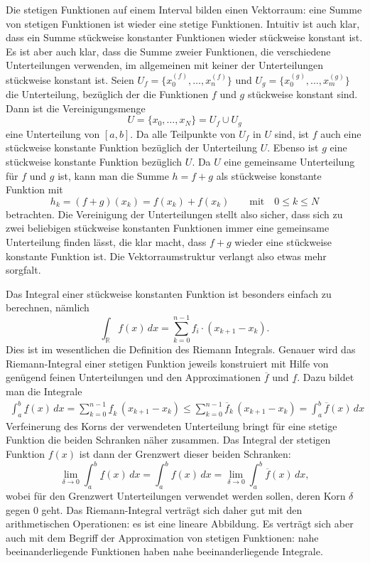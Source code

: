 Die stetigen Funktionen auf einem Interval bilden einen Vektorraum: eine
Summe von stetigen Funktionen ist wieder eine stetige Funktionen.
Intuitiv ist auch klar, dass ein Summe stückweise konstanter Funktionen
wieder stückweise konstant ist.
Es ist aber auch klar, dass die Summe zweier Funktionen, die verschiedene
Unterteilungen verwenden, im allgemeinen mit keiner der Unterteilungen
stückweise konstant ist.
Seien $U_f=\{x_0^{(f)},\dots,x_n^{(f)}\}$ und
$U_g=\{x_0^{(g)},\dots,x_m^{(g)}\}$ die Unterteilung, bezüglich der 
die Funktionen $f$ und $g$ stückweise konstant sind.
Dann ist die Vereinigungsmenge
\[
U= \{x_0,\dots,x_N\} = U_f\cup U_g
\]
eine Unterteilung von $[a,b]$.
Da alle Teilpunkte von $U_f$ in $U$ sind, ist $f$ auch eine stückweise
konstante Funktion bezüglich der Unterteilung $U$. 
Ebenso ist $g$ eine stückweise konstante Funktion bezüglich $U$.
Da $U$ eine gemeinsame Unterteilung für $f$ und $g$ ist, kann man
die Summe $h=f+g$ als stückweise konstante Funktion mit
\[
h_k
=
(f+g)(x_k)
= 
f(x_k) + f(x_k)
\qquad\text{mit}\quad
0\le k\le N
\]
betrachten.
Die Vereinigung der Unterteilungen stellt also sicher, dass sich
zu zwei beliebigen stückweise konstanten Funktionen immer eine
gemeinsame Unterteilung finden lässt, die klar macht, dass $f+g$
wieder eine stückweise konstante Funktion ist.
Die Vektorraumstruktur verlangt also etwas mehr sorgfalt.

Das Integral einer stückweise konstanten Funktion ist besonders einfach 
zu berechnen, nämlich
\[
\int_{\mathbb R} f(x)\,dx = \sum_{k=0}^{n-1} f_i\cdot (x_{k+1}-x_k).
\]
Dies ist im wesentlichen die Definition des Riemann Integrals.
Genauer wird das Riemann-Integral einer stetigen Funktion jeweils
konstruiert mit Hilfe von genügend feinen Unterteilungen und den
Approximationen $\overline{f}$ und $\underline{f}$.
Dazu bildet man die Integrale
\begin{align*}
\int_a^b \underline{f}(x)\,dx
=
\sum_{k=0}^{n-1} \underline{f}_{k}\,(x_{k+1}-x_k)
\le
\sum_{k=0}^{n-1} \overline{f}_{k}\,(x_{k+1}-x_k)
=
\int_a^b \overline{f}(x)\,dx
\end{align*}
Verfeinerung des Korns der verwendeten Unterteilung bringt für eine
stetige Funktion die beiden Schranken näher zusammen.
Das Integral der stetigen Funktion $f(x)$ ist dann der Grenzwert
dieser beiden Schranken:
\[
\lim_{\delta\to 0}
\int_a^b \underline{f}(x)\,dx
=
\int_a^b f(x)\,dx
=
\lim_{\delta\to 0}
\int_a^b \overline{f}(x)\,dx,
\]
wobei für den Grenzwert Unterteilungen verwendet werden sollen, deren
Korn $\delta$ gegen $0$ geht.
Das Riemann-Integral verträgt sich daher gut mit den arithmetischen
Operationen: es ist eine lineare Abbildung.
Es verträgt sich aber auch mit dem Begriff der Approximation von
stetigen Funktionen: nahe beeinanderliegende Funktionen haben nahe
beeinanderliegende Integrale.


